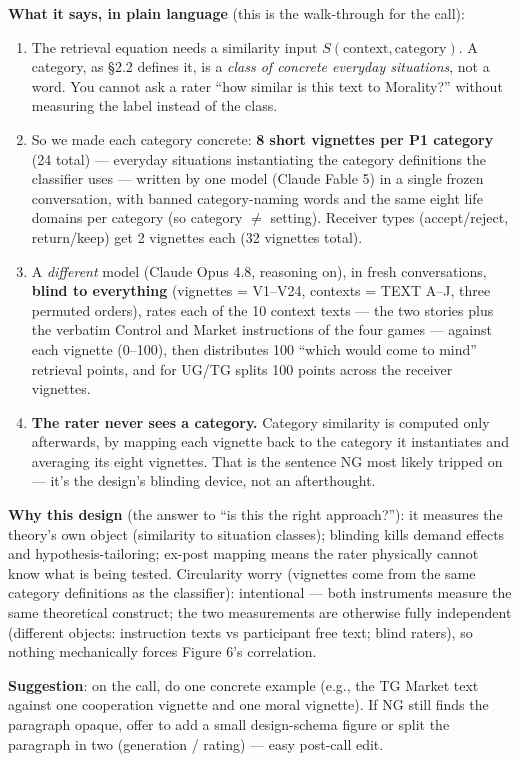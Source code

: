 \documentclass[11pt]{article}
\begin{document}
\textbf{What it says, in plain language} (this is the walk-through for the call):
\begin{enumerate}
\item The retrieval equation needs a similarity input $S(\text{context}, \text{category})$. A category, as \S2.2 defines it, is a \emph{class of concrete everyday situations}, not a word. You cannot ask a rater ``how similar is this text to Morality?'' without measuring the label instead of the class.
\item So we made each category concrete: \textbf{8 short vignettes per P1 category} (24 total) --- everyday situations instantiating the category definitions the classifier uses --- written by one model (Claude Fable 5) in a single frozen conversation, with banned category-naming words and the same eight life domains per category (so category $\ne$ setting). Receiver types (accept/reject, return/keep) get 2 vignettes each (32 vignettes total).
\item A \emph{different} model (Claude Opus 4.8, reasoning on), in fresh conversations, \textbf{blind to everything} (vignettes = V1--V24, contexts = TEXT A--J, three permuted orders), rates each of the 10 context texts --- the two stories plus the verbatim Control and Market instructions of the four games --- against each vignette (0--100), then distributes 100 ``which would come to mind'' retrieval points, and for UG/TG splits 100 points across the receiver vignettes.
\item \textbf{The rater never sees a category.} Category similarity is computed only afterwards, by mapping each vignette back to the category it instantiates and averaging its eight vignettes. That is the sentence NG most likely tripped on --- it's the design's blinding device, not an afterthought.
\end{enumerate}

\textbf{Why this design} (the answer to ``is this the right approach?''): it measures the theory's own object (similarity to situation classes); blinding kills demand effects and hypothesis-tailoring; ex-post mapping means the rater physically cannot know what is being tested. Circularity worry (vignettes come from the same category definitions as the classifier): intentional --- both instruments measure the same theoretical construct; the two measurements are otherwise fully independent (different objects: instruction texts vs participant free text; blind raters), so nothing mechanically forces Figure 6's correlation.

\textbf{Suggestion}: on the call, do one concrete example (e.g., the TG Market text against one cooperation vignette and one moral vignette). If NG still finds the paragraph opaque, offer to add a small design-schema figure or split the paragraph in two (generation / rating) --- easy post-call edit.
\end{document}
